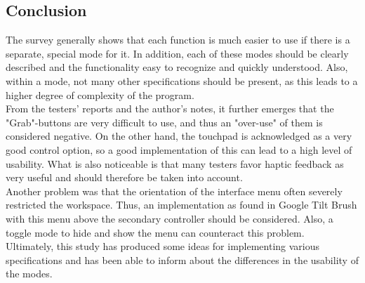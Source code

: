 \documentclass{report}
\begin{document}
		\subsection{Conclusion} \label{IntuitionStudyConclusion}
		\startsubsection
			The survey generally shows that each function is much easier to use if there is a separate, special mode for it. In addition, each of these modes should be clearly described and the functionality easy to recognize and quickly understood. Also, within a mode, not many other specifications should be present, as this leads to a higher degree of complexity of the program. \\
			From the testers' reports and the author's notes, it further emerges that the "Grab"-buttons are very difficult to use, and thus an "over-use" of them is considered negative. On the other hand, the touchpad is acknowledged as a very good control option, so a good implementation of this can lead to a high level of usability. What is also noticeable is that many testers favor haptic feedback as very useful and should therefore be taken into account. \\
			Another problem was that the orientation of the interface menu often severely restricted the workspace. Thus, an implementation as found in Google Tilt Brush with this menu above the secondary controller should be considered. Also, a toggle mode to hide and show the menu can counteract this problem. \\
			Ultimately, this study has produced some ideas for implementing various specifications and has been able to inform about the differences in the usability of the modes.
			\newpage
\end{document}
